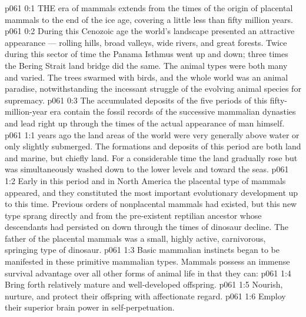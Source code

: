 \vs p061 0:1 THE era of mammals extends from the times of the origin of placental mammals to the end of the ice age, covering a little less than fifty million years.
\vs p061 0:2 During this Cenozoic age the world’s landscape presented an attractive appearance --- rolling hills, broad valleys, wide rivers, and great forests. Twice during this sector of time the Panama Isthmus went up and down; three times the Bering Strait land bridge did the same. The animal types were both many and varied. The trees swarmed with birds, and the whole world was an animal paradise, notwithstanding the incessant struggle of the evolving animal species for supremacy.
\vs p061 0:3 The accumulated deposits of the five periods of this fifty\hyp{}million\hyp{}year era contain the fossil records of the successive mammalian dynasties and lead right up through the times of the actual appearance of man himself.
\vs p061 1:1  years ago the land areas of the world were very generally above water or only slightly submerged. The formations and deposits of this period are both land and marine, but chiefly land. For a considerable time the land gradually rose but was simultaneously washed down to the lower levels and toward the seas.
\vs p061 1:2 Early in this period and in North America the placental type of mammals  appeared, and they constituted the most important evolutionary development up to this time. Previous orders of nonplacental mammals had existed, but this new type sprang directly and  from the pre\hyp{}existent reptilian ancestor whose descendants had persisted on down through the times of dinosaur decline. The father of the placental mammals was a small, highly active, carnivorous, springing type of dinosaur.
\vs p061 1:3 Basic mammalian instincts began to be manifested in these primitive mammalian types. Mammals possess an immense survival advantage over all other forms of animal life in that they can:
\vs p061 1:4 \bibnobreakspace Bring forth relatively mature and well\hyp{}developed offspring.
\vs p061 1:5 \bibnobreakspace Nourish, nurture, and protect their offspring with affectionate regard.
\vs p061 1:6 \bibnobreakspace Employ their superior brain power in self\hyp{}perpetuation.
